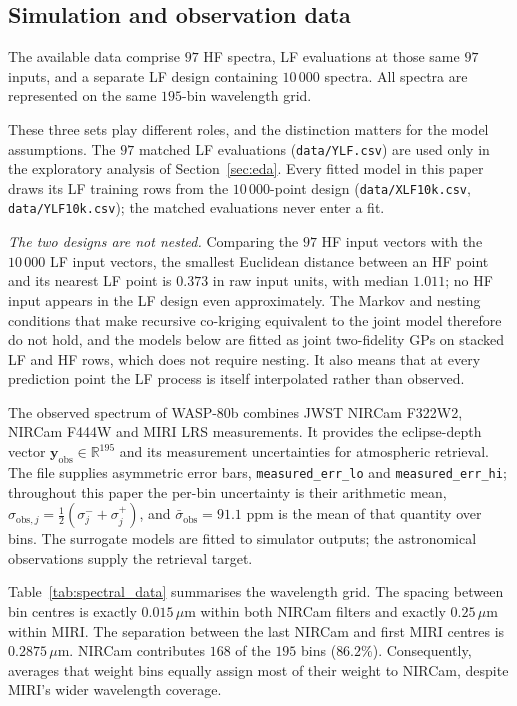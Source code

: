 \documentclass[12pt, letterpaper, oneside]{article}
\begin{document}
\subsection{Simulation and observation data}

The available data comprise $97$ HF spectra, LF evaluations at those same $97$
inputs, and a separate LF design containing $10\,000$ spectra. All spectra are
represented on the same $195$-bin wavelength grid.

These three sets play different roles, and the distinction matters for the
model assumptions. The $97$ matched LF evaluations
(\texttt{data/YLF.csv}) are used only in the exploratory analysis of
Section~\ref{sec:eda}. Every fitted model in this paper draws its LF training
rows from the $10\,000$-point design (\texttt{data/XLF10k.csv},
\texttt{data/YLF10k.csv}); the matched evaluations never enter a fit.

\emph{The two designs are not nested.} Comparing the $97$ HF input vectors
with the $10\,000$ LF input vectors, the smallest Euclidean distance between
an HF point and its nearest LF point is $0.373$ in raw input units, with
median $1.011$; no HF input appears in the LF design even approximately. The
Markov and nesting conditions that make recursive co-kriging equivalent to the
joint model \citep{LeGratietGarnier2014} therefore do not hold, and the models
below are fitted as joint two-fidelity GPs on stacked LF and HF rows, which
does not require nesting. It also means that at every prediction point the LF
process is itself interpolated rather than observed.

The observed spectrum of WASP-80b combines JWST NIRCam F322W2, NIRCam F444W
and MIRI LRS measurements. It provides the eclipse-depth vector
$\mathbf{y}_{\mathrm{obs}}\in\mathbb{R}^{195}$ and its measurement
uncertainties for atmospheric retrieval. The file supplies asymmetric error
bars, \texttt{measured\_err\_lo} and \texttt{measured\_err\_hi}; throughout
this paper the per-bin uncertainty is their arithmetic mean,
$\sigma_{\mathrm{obs},j}=\tfrac12(\sigma^-_j+\sigma^+_j)$, and
$\bar\sigma_{\mathrm{obs}}=91.1$ ppm is the mean of that quantity over bins.
The surrogate models are fitted to simulator outputs; the astronomical
observations supply the retrieval target.

Table~\ref{tab:spectral_data} summarises the wavelength grid. The spacing
between bin centres is exactly $0.015\,\mu\mathrm{m}$ within both NIRCam
filters and exactly $0.25\,\mu\mathrm{m}$ within MIRI. The separation between
the last NIRCam and first MIRI centres is $0.2875\,\mu\mathrm{m}$. NIRCam
contributes $168$ of the $195$ bins ($86.2\%$). Consequently, averages that
weight bins equally assign most of their weight to NIRCam, despite MIRI's
wider wavelength coverage.
\end{document}
